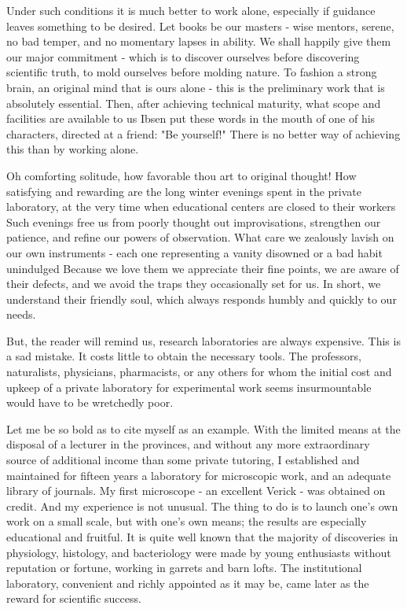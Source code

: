 \documentclass{article}
\begin{document}
Under such conditions it is much better to work alone, especially if guidance leaves something to be desired. Let books be our masters - wise mentors, serene, no bad temper, and no momentary lapses in ability. We shall happily give them our major commitment - which is to discover ourselves before discovering scientific truth, to mold ourselves before molding nature. To fashion a strong brain, an original mind that is ours alone - this is the preliminary work that is absolutely essential. Then, after achieving technical maturity, what scope and facilities are available to us\! Ibsen put these words in the mouth of one of his characters, directed at a friend: "Be yourself!" There is no better way of achieving this than by working alone.

Oh comforting solitude, how favorable thou art to original thought! How satisfying and rewarding are the long winter evenings spent in the private laboratory, at the very time when educational centers are closed to their workers\! Such evenings free us from poorly thought out improvisations, strengthen our patience, and refine our powers of observation. What care we zealously lavish on our own instruments - each one representing a vanity disowned or a bad habit unindulged\! Because we love them we appreciate their fine points, we are aware of their defects, and we avoid the traps they occasionally set for us. In short, we understand their friendly soul, which always responds humbly and quickly to our needs.

But, the reader will remind us, research laboratories are always expensive. This is a sad mistake. It costs little to obtain the necessary tools. The professors, naturalists, physicians, pharmacists, or any others for whom the initial cost and upkeep of a private laboratory for experimental work seems insurmountable would have to be wretchedly poor.

Let me be so bold as to cite myself as an example. With the limited means at the disposal of a lecturer in the provinces, and without any more extraordinary source of additional income than some private tutoring, I established and maintained for fifteen years a laboratory for microscopic work, and an adequate library of journals. My first microscope - an excellent Verick - was obtained on credit. And my experience is not unusual. The thing to do is to launch one’s own work on a small scale, but with one’s own means; the results are especially educational and fruitful. It is quite well known that the majority of discoveries in physiology, histology, and bacteriology were made by young enthusiasts without reputation or fortune, working in garrets and barn lofts. The institutional laboratory, convenient and richly appointed as it may be, came later as the reward for scientific success.
\end{document}
